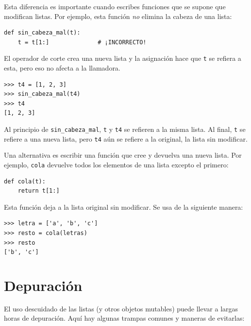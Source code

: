 \documentclass[10pt]{book}
\begin{document}
Esta diferencia es importante cuando escribes funciones que
se supone que modifican listas.  Por ejemplo, esta función
{\em no} elimina la cabeza de una lista:
%
\begin{verbatim}
def sin_cabeza_mal(t):
    t = t[1:]              # ¡INCORRECTO!
\end{verbatim}
%
El operador de corte crea una nueva lista y la asignación
hace que {\tt t} se refiera a esta, pero eso no afecta a la llamadora.
%
\begin{verbatim}
>>> t4 = [1, 2, 3]
>>> sin_cabeza_mal(t4)
>>> t4
[1, 2, 3]
\end{verbatim}
%
Al principio de \verb"sin_cabeza_mal", {\tt t} y {\tt t4}
se refieren a la misma lista.  Al final, {\tt t} se refiere a una nueva lista,
pero {\tt t4} aún se refiere a la original, la lista sin modificar.

Una alternativa es escribir una función que cree y
devuelva una nueva lista.  Por
ejemplo, {\tt cola} devuelve todos los elementos
de una lista excepto el primero:

\begin{verbatim}
def cola(t):
    return t[1:]
\end{verbatim}
%
Esta función deja a la lista original sin modificar.
Se usa de la siguiente manera:

\begin{verbatim}
>>> letra = ['a', 'b', 'c']
>>> resto = cola(letras)
>>> resto
['b', 'c']
\end{verbatim}



\section{Depuración}

El uso descuidado de las listas (y otros objetos mutables)
puede llevar a largas horas de depuración.  Aquí hay algunas
trampas comunes y maneras de evitarlas:
\end{document}
